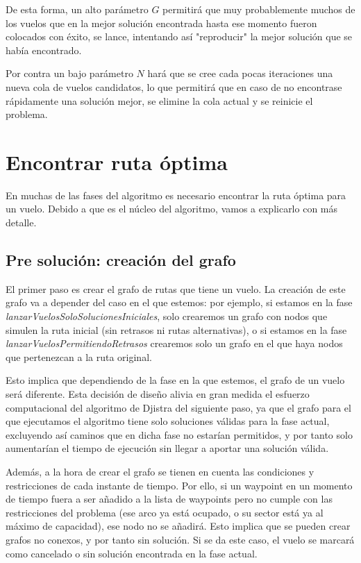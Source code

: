 De esta forma, un alto parámetro $G$ permitirá que muy probablemente muchos de los vuelos que en la mejor solución encontrada hasta ese momento fueron colocados con éxito, se lance, intentando así "reproducir" la mejor solución que se había encontrado. 

Por contra un bajo parámetro $N$ hará que se cree cada pocas iteraciones una nueva cola de vuelos candidatos, lo que permitirá que en caso de no encontrase rápidamente una solución mejor, se elimine la cola actual y se reinicie el problema.


\section{Encontrar ruta óptima}
En muchas de las fases del algoritmo es necesario encontrar la ruta óptima para un vuelo. Debido a que es el núcleo del algoritmo, vamos a explicarlo con más detalle.
\subsection{Pre solución: creación del grafo}
El primer paso es crear el grafo de rutas que tiene un vuelo. La creación de este grafo va a depender del caso en el que estemos: por ejemplo, si estamos en la fase \textit{lanzarVuelosSoloSolucionesIniciales}, solo crearemos un grafo con nodos que simulen la ruta inicial (sin retrasos ni rutas alternativas), o si estamos en la fase \textit{lanzarVuelosPermitiendoRetrasos} crearemos solo un grafo en el que haya nodos  que pertenezcan a la ruta original.

Esto implica que dependiendo de la fase en la que estemos, el grafo de un vuelo será diferente. Esta decisión de diseño alivia en gran medida el esfuerzo computacional del algoritmo de  Djistra del siguiente paso, ya que el grafo para el que ejecutamos el algoritmo tiene solo soluciones válidas para la fase actual, excluyendo así caminos que en dicha fase no estarían permitidos, y por tanto solo aumentarían el tiempo de ejecución sin llegar a aportar una solución válida.

Además, a la hora de crear el grafo se tienen en cuenta las condiciones y restricciones de cada instante de tiempo. Por ello, si un waypoint en un momento de tiempo fuera a ser añadido a la lista de waypoints pero no cumple con las restricciones del problema (ese arco ya está ocupado, o su sector está ya al máximo de capacidad), ese nodo no se añadirá. Esto implica que se pueden crear grafos no conexos, y por tanto sin solución. Si se da este caso, el vuelo se marcará como cancelado o sin solución encontrada en la fase actual.

